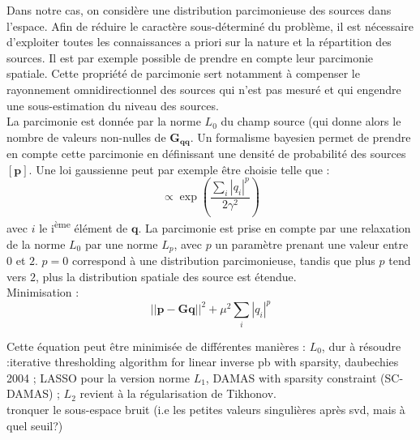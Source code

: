 Dans notre cas, on considère une distribution parcimonieuse des sources dans l'espace. Afin de réduire le caractère sous-déterminé du problème, il est nécessaire d'exploiter toutes les connaissances a priori sur la nature et la répartition des sources. Il est par exemple possible de prendre en compte leur parcimonie spatiale. Cette propriété de parcimonie sert notamment à compenser le rayonnement omnidirectionnel des sources qui n'est pas mesuré et qui engendre une sous-estimation du niveau des sources. \\
La parcimonie est donnée par la norme $L_0$ du champ source (qui donne alors le nombre de valeurs non-nulles de $\bm{G_{qq}}$. Un formalisme bayesien permet de prendre en compte cette parcimonie en définissant une densité de probabilité des sources $[\bm{p}]$. Une loi gaussienne peut par exemple être choisie telle que : 
\begin{equation}
 [\bm{p}] \propto \exp\left(\frac{\sum_i |q_i|^p}{2\gamma^2}\right)
\end{equation}
avec $i$ le i\textsuperscript{ème} élément de $\bm{q}$. La parcimonie est prise en compte par une relaxation de la norme $L_0$ par une norme $L_p$, avec $p$ un paramètre prenant une valeur entre $0$ et $2$. $p=0$ correspond à une distribution parcimonieuse, tandis que plus $p$ tend vers $2$, plus la distribution spatiale des source est étendue.\\

Minimisation : 
\begin{equation}
	||\bm{p}-\bm{G}\bm{q}||^2 + \mu^2\sum_i |q_i|^p
\end{equation}

Cette équation peut être minimisée de différentes manières : $L_0$, dur à résoudre :iterative thresholding algorithm for linear inverse pb with sparsity, daubechies 2004 ; LASSO pour la version norme $L_1$, DAMAS with sparsity constraint (SC-DAMAS) ; $L_2$ revient à la régularisation de Tikhonov.  \\





tronquer le sous-espace bruit (i.e les petites valeurs singulières après svd, mais à quel seuil?)


